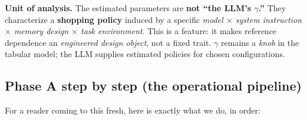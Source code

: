 \documentclass[11pt]{article}
\newcommand{\crit}[1]{\textcolor{crit}{\textbf{#1}}}
\begin{document}
\noindent\crit{Unit of analysis.} The estimated parameters are \textbf{not ``the LLM's $\gamma$.''} They
characterize a \textbf{shopping policy} induced by a specific
\emph{model $\times$ system instruction $\times$ memory design $\times$ task environment}. This is a
feature: it makes reference dependence an \emph{engineered design object}, not a fixed trait. $\gamma$
remains a \emph{knob} in the tabular model; the LLM supplies estimated policies for chosen configurations.

\subsection*{Phase A step by step (the operational pipeline)}

For a reader coming to this fresh, here is exactly what we do, in order:
\end{document}
